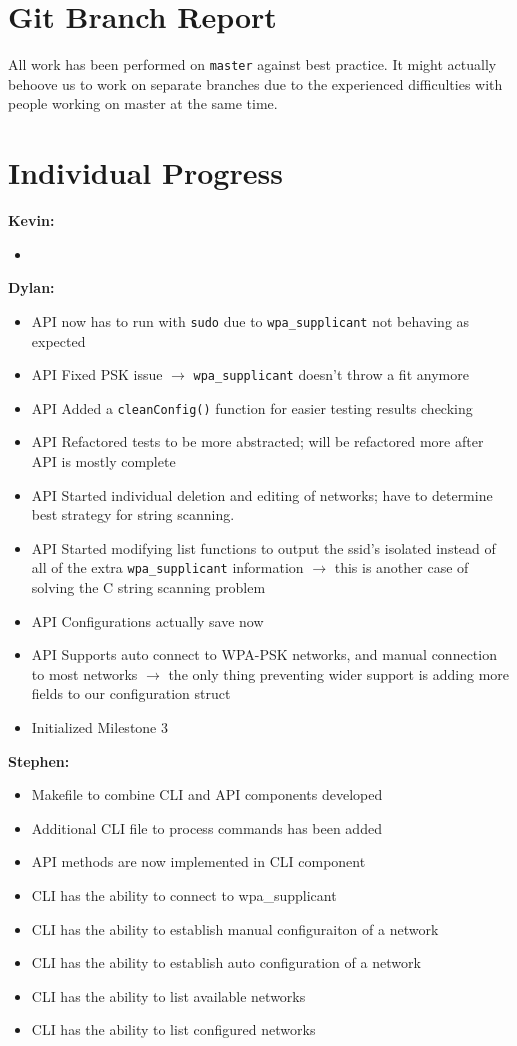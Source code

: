 \documentclass[11pt]{article}
\begin{document}
\section{Git Branch Report}
All work has been performed on \texttt{master} against best practice. It might actually behoove us to
work on separate branches due to the experienced difficulties with people working on master at the same
time.


\section{Individual Progress}

\textbf{Kevin:}
\begin{itemize}
  \item
\end{itemize}

\textbf{Dylan:}
\begin{itemize}
  \item API now has to run with \texttt{sudo} due to \texttt{wpa\_supplicant} not behaving as expected
  \item API Fixed PSK issue $\rightarrow$ \texttt{wpa\_supplicant} doesn't throw a fit anymore
  \item API Added a \texttt{cleanConfig()} function for easier testing results checking
  \item API Refactored tests to be more abstracted; will be refactored more after API is mostly complete
  \item API Started individual deletion and editing of networks; have to determine best strategy for string scanning.
  \item API Started modifying list functions to output the ssid's isolated instead of all of the extra \texttt{wpa\_supplicant}
    information $\rightarrow$ this is another case of solving the C string scanning problem
  \item API Configurations actually save now
  \item API Supports auto connect to WPA-PSK networks, and manual connection to most networks $\rightarrow$ the only thing
    preventing wider support is adding more fields to our configuration struct
  \item Initialized Milestone 3
\end{itemize}

\textbf{Stephen:}
\begin{itemize}
  \item Makefile to combine CLI and API components developed 
  \item Additional CLI file to process commands has been added
  \item API methods are now implemented in CLI component
  \item CLI has the ability to connect to wpa_supplicant 
  \item CLI has the ability to establish manual configuraiton of a network
  \item CLI has the ability to establish auto configuration of a network 
  \item CLI has the ability to list available networks 
  \item CLI has the ability to list configured networks 
\end{itemize}
\end{document}
